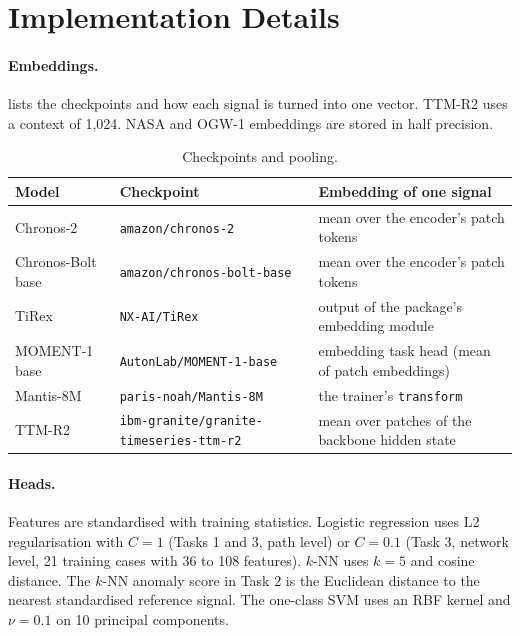 \documentclass{article}
\begin{document}
\section{Implementation Details}
\label{app:impl}

\paragraph{Embeddings.}  lists the checkpoints and how each signal is turned into
one vector. TTM-R2 uses a context of 1{,}024. NASA and OGW-1 embeddings are stored in half precision.

\begin{table}[H]
  \caption{Checkpoints and pooling.}
  \label{tab:checkpoints}
  \centering
  \small
  \begin{tabular}{@{}lll@{}}
    \toprule
    Model & Checkpoint & Embedding of one signal \\
    \midrule
    Chronos-2 & \texttt{amazon/chronos-2} & mean over the encoder's patch tokens \\
    Chronos-Bolt base & \texttt{amazon/chronos-bolt-base} & mean over the encoder's patch tokens \\
    TiRex & \texttt{NX-AI/TiRex} & output of the package's embedding module \\
    MOMENT-1 base & \texttt{AutonLab/MOMENT-1-base} & embedding task head (mean of patch embeddings) \\
    Mantis-8M & \texttt{paris-noah/Mantis-8M} & the trainer's \texttt{transform} \\
    TTM-R2 & \texttt{ibm-granite/granite-timeseries-ttm-r2} & mean over patches of the backbone hidden state \\
    \bottomrule
  \end{tabular}
\end{table}

\paragraph{Heads.} Features are standardised with training statistics. Logistic regression uses L2
regularisation with $C=1$ (Tasks 1 and 3, path level) or $C=0.1$ (Task 3, network level, 21 training cases
with 36 to 108 features). $k$-NN uses $k=5$ and cosine distance. The $k$-NN anomaly score in Task 2 is the
Euclidean distance to the nearest standardised reference signal. The one-class SVM uses an RBF kernel and
$\nu=0.1$ on 10 principal components.
\end{document}
